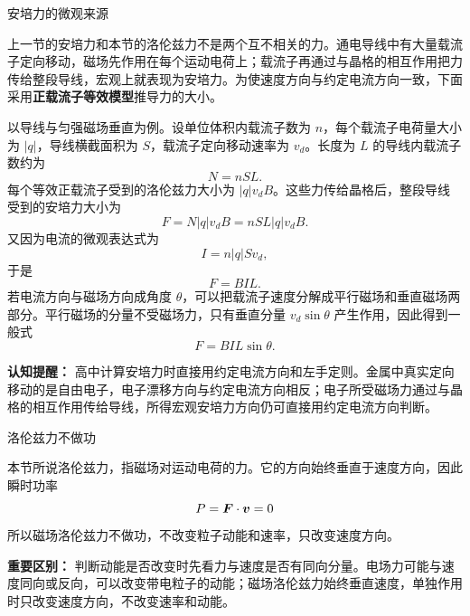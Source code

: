 \begin{conceptbox}{安培力的微观来源}

上一节的安培力和本节的洛伦兹力不是两个互不相关的力。通电导线中有大量载流子定向移动，磁场先作用在每个运动电荷上；载流子再通过与晶格的相互作用把力传给整段导线，宏观上就表现为安培力。为使速度方向与约定电流方向一致，下面采用\textbf{正载流子等效模型}推导力的大小。

\begin{center}


\label{fig:ampere-lorentz-micro}
\end{center}

以导线与匀强磁场垂直为例。设单位体积内载流子数为 $n$，每个载流子电荷量大小为 $|q|$，导线横截面积为 $S$，载流子定向移动速率为 $v_d$。长度为 $L$ 的导线内载流子数约为
\[
N=nSL.
\]
每个等效正载流子受到的洛伦兹力大小为 $|q|v_dB$。这些力传给晶格后，整段导线受到的安培力大小为
\[
F=N|q|v_dB=nSL|q|v_dB.
\]
又因为电流的微观表达式为
\[
I=n|q|Sv_d,
\]
于是
\[
F=BIL.
\]
若电流方向与磁场方向成角度 $\theta$，可以把载流子速度分解成平行磁场和垂直磁场两部分。平行磁场的分量不受磁场力，只有垂直分量 $v_d\sin\theta$ 产生作用，因此得到一般式
\[
F=BIL\sin\theta.
\]

\textbf{认知提醒：} 高中计算安培力时直接用约定电流方向和左手定则。金属中真实定向移动的是自由电子，电子漂移方向与约定电流方向相反；电子所受磁场力通过与晶格的相互作用传给导线，所得宏观安培力方向仍可直接用约定电流方向判断。

\end{conceptbox}

\begin{conceptbox}{洛伦兹力不做功}

本节所说洛伦兹力，指磁场对运动电荷的力。它的方向始终垂直于速度方向，因此瞬时功率
\[
P = \boldsymbol{F}\cdot \boldsymbol{v}=0
\]
所以磁场洛伦兹力不做功，不改变粒子动能和速率，只改变速度方向。

\begin{center}


\label{fig:lorentz-no-work}
\end{center}

\textbf{重要区别：} 判断动能是否改变时先看力与速度是否有同向分量。电场力可能与速度同向或反向，可以改变带电粒子的动能；磁场洛伦兹力始终垂直速度，单独作用时只改变速度方向，不改变速率和动能。

\end{conceptbox}

